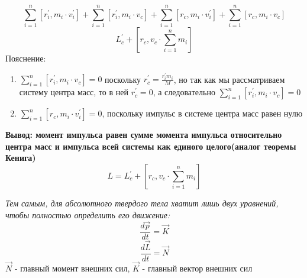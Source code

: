 \documentclass[12pt,a4paper]{report}
\begin{document}
\[ \sum_{i = 1}^n [r_i^{\prime}, m_i \cdot v_i^{\prime}] + \sum_{i = 1}^n [r_i^{\prime}, m_i \cdot v_c] + \sum_{i = 1}^n [r_c, m_i \cdot v_i^{\prime}] + \sum_{i = 1}^n [r_c, m_i \cdot v_c]\]
\[ L_c^{\prime} + [r_c, v_c \cdot \sum_{i = 1}^n m_i]\]
Пояснение:
\begin{enumerate}
    \item $\sum_{i = 1}^n [r_i^{\prime}, m_i \cdot v_c]  = 0$ поскольку $r_c^{\prime} = \frac{r_i^{\prime}m_i}{M}$, но так как мы рассматриваем систему центра масс, то в ней $r_c^{\prime}  = 0$, а следовательно $\sum_{i = 1}^n [r_i^{\prime}, m_i \cdot v_c]  = 0$
    \item $\sum_{i = 1}^n [r_c, m_i \cdot v_i^{\prime}] = 0$, поскольку импульс в системе центра масс равен нулю
\end{enumerate}
\textbf{Вывод: момент импульса равен сумме момента импульса относительно центра масс и импульса всей системы как единого целого(аналог теоремы Кенига)}
\[ L = L_c^{\prime} + [r_c, v_c \cdot \sum_{i = 1}^n m_i]\]

\textit{Тем самым, для абсолютного твердого тела хватит лишь двух уравнений, чтобы полностью определить его движение:}
\[ \frac{d\vec p}{dt} = \vec K \]
\[ \frac{d\vec L}{dt} = \vec N\]
$\vec N$ - главный момент внешних сил, $\vec K$ - главный вектор внешних сил
\end{document}
